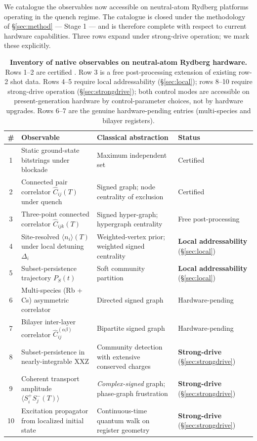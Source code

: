 \documentclass[10pt]{article}
\begin{document}
We catalogue the observables now accessible on neutral-atom Rydberg platforms operating in the quench regime. The catalogue is closed under the methodology of \S\ref{sec:method} --- Stage 1 --- and is therefore complete with respect to current hardware capabilities. Three rows expand under strong-drive operation; we mark these explicitly.

\begin{table}[h]
\centering
\small
\renewcommand{\arraystretch}{1.25}
\begin{tabular}{@{}c >{\raggedright\arraybackslash}p{4.6cm} >{\raggedright\arraybackslash}p{5.2cm} l@{}}
\toprule
\textbf{\#} & \textbf{Observable} & \textbf{Classical abstraction} & \textbf{Status} \\
\midrule
1  & Static ground-state bitstrings under blockade & Maximum independent set & Certified \cite{ebadi2022quantum} \\
2  & Connected pair correlator $\hat C_{ij}(T)$ under quench & Signed graph; node centrality of exclusion & Certified \cite{jurczak2026atomrank} \\
3  & Three-point connected correlator $\hat C_{ijk}(T)$ & Signed hyper-graph; hypergraph centrality & Free post-processing \\
4  & Site-resolved $\langle n_i\rangle(T)$ under local detuning $\Delta_i$ & Weighted-vertex prior; weighted signed centrality & \textbf{Local addressability} (\S\ref{sec:local}) \\
5  & Subset-persistence trajectory $P_S(t)$ & Soft community partition & \textbf{Local addressability} (\S\ref{sec:local}) \\
6  & Multi-species (Rb + Cs) asymmetric correlator & Directed signed graph & Hardware-pending \\
7  & Bilayer inter-layer correlator $\hat C^{(\alpha\beta)}_{ij}$ & Bipartite signed graph & Hardware-pending \\
8  & Subset-persistence in nearly-integrable XXZ & Community detection with extensive conserved charges & \textbf{Strong-drive} (\S\ref{sec:strongdrive}) \\
9  & Coherent transport amplitude $\langle S^+_i S^-_j(T)\rangle$ & \emph{Complex-signed} graph; phase-graph frustration & \textbf{Strong-drive} (\S\ref{sec:strongdrive}) \\
10 & Excitation propagator from localized initial state & Continuous-time quantum walk on register geometry & \textbf{Strong-drive} (\S\ref{sec:strongdrive}) \\
\bottomrule
\end{tabular}
\caption{\textbf{Inventory of native observables on neutral-atom Rydberg hardware.} Rows 1--2 are certified \cite{ebadi2022quantum,jurczak2026atomrank}. Row 3 is a free post-processing extension of existing row-2 shot data. Rows 4--5 require local addressability (\S\ref{sec:local}); rows 8--10 require strong-drive operation (\S\ref{sec:strongdrive}); both control modes are accessible on present-generation hardware by control-parameter choices, not by hardware upgrades. Rows 6--7 are the genuine hardware-pending entries (multi-species and bilayer registers).}
\label{tab:inventory}
\end{table}
\end{document}
